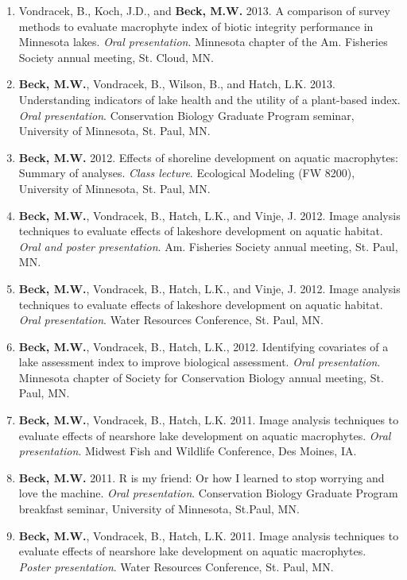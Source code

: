 \documentclass[letterpaper,12pt]{article}
\begin{document}
\begin{enumerate}
\item Vondracek, B., Koch, J.D., and {\bf Beck, M.W.} 2013. A comparison of survey methods to evaluate macrophyte index of biotic integrity performance in Minnesota lakes. \textit{Oral presentation}. Minnesota chapter of the Am. Fisheries Society annual meeting, St. Cloud, MN.

\item {\bf Beck, M.W.}, Vondracek, B., Wilson, B., and Hatch, L.K. 2013. Understanding indicators of lake health and the utility of a plant-based index. \textit{Oral presentation}. Conservation Biology Graduate Program seminar, University of Minnesota, St. Paul, MN.

\item {\bf Beck, M.W.} 2012. Effects of shoreline development on aquatic macrophytes: Summary of analyses. \textit{Class lecture}. Ecological Modeling (FW 8200), University of Minnesota, St. Paul, MN.

\item {\bf Beck, M.W.}, Vondracek, B., Hatch, L.K., and Vinje, J. 2012. Image analysis techniques to evaluate effects of lakeshore development on aquatic habitat. \textit{Oral and poster presentation}. Am. Fisheries Society annual meeting, St. Paul, MN.

\item {\bf Beck, M.W.}, Vondracek, B., Hatch, L.K., and Vinje, J. 2012. Image analysis techniques to evaluate effects of lakeshore development on aquatic habitat. \textit{Oral presentation}. Water Resources Conference, St. Paul, MN.

\item {\bf Beck, M.W.}, Vondracek, B., Hatch, L.K., 2012. Identifying covariates of a lake assessment index to improve biological assessment. \textit{Oral presentation}. Minnesota chapter of Society for Conservation Biology annual meeting, St. Paul, MN.

\item {\bf Beck, M.W.}, Vondracek, B., Hatch, L.K. 2011. Image analysis techniques to evaluate effects of nearshore lake development on aquatic macrophytes. \textit{Oral presentation}. Midwest Fish and Wildlife Conference, Des Moines, IA.

\item {\bf Beck, M.W.} 2011. R is my friend: Or how I learned to stop worrying and love the machine. \textit{Oral presentation}. Conservation Biology Graduate Program breakfast seminar, University of Minnesota, St.Paul, MN.

\item {\bf Beck, M.W.}, Vondracek, B., Hatch, L.K. 2011. Image analysis techniques to evaluate effects of nearshore lake development on aquatic macrophytes. \textit{Poster presentation}. Water Resources Conference, St. Paul, MN.


\end{enumerate}
\end{document}
